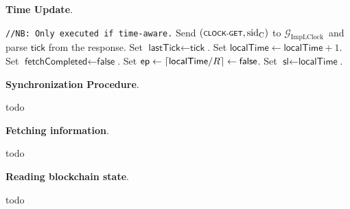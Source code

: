 \textbf{Time Update}.\label{apndx:update-time-protocol}
\begin{protocol}
    \caption{$\textsf{UpdateTime}(P, R)$}
    \begin{algorithmic}[1]
        \noindent
        \lstinline|//NB: Only executed if time-aware.|
        \State Send $(\textsf{\scriptsize{CLOCK-GET}}, \text{sid}_\text{C})$ to $\mathcal{G}_{\text{ImpLClock}}$\
        and parse $\textsf{tick}$ from the response.
            \State Set $\textsf{lastTick} \leftarrow \textsf{tick}$.
            \State Set $\textsf{localTime} \leftarrow \textsf{localTime} + 1$.
            \State Set $\textsf{fetchCompleted} \leftarrow \textsf{false}$.
        \EndIf
        \State Set $\textsf{ep} \leftarrow \lceil \textsf{localTime}/\\R \rceil \leftarrow \textsf{false}$.
        \State Set $\textsf{sl} \leftarrow \textsf{localTime}$.

    \end{algorithmic}\label{alg:update-time-protocol}
\end{protocol}

\bigbreak
\bigbreak
\noindent
{}
\textbf{Synchronization Procedure}.\label{apndx:sync-proc}
\begin{protocol}
    \caption{$\textsf{SyncProc}(P, R)$}
    \begin{algorithmic}[1]

        todo
    \end{algorithmic}\label{alg:sync-proc}
\end{protocol}

\bigbreak
\bigbreak
\noindent
{}
\textbf{Fetching information}.\label{apndx:fetch-info-protocol}
\begin{protocol}
    \caption{$\textsf{FetchInformation}(P, \text{sid})$}
    \begin{algorithmic}[1]

        todo
    \end{algorithmic}\label{alg:fetch-info-protocol}
\end{protocol}

\bigbreak
\bigbreak
\noindent
{}
\textbf{Reading blockchain state}.\label{apndx:read-state-protocol}
\begin{protocol}
    \caption{$\textsf{ReadState}(P, \text{sid}, R, \mathcal{C}_{\text{loc}})$}
    \begin{algorithmic}[1]

        todo
    \end{algorithmic}\label{alg:read-state-protocol}
\end{protocol}
